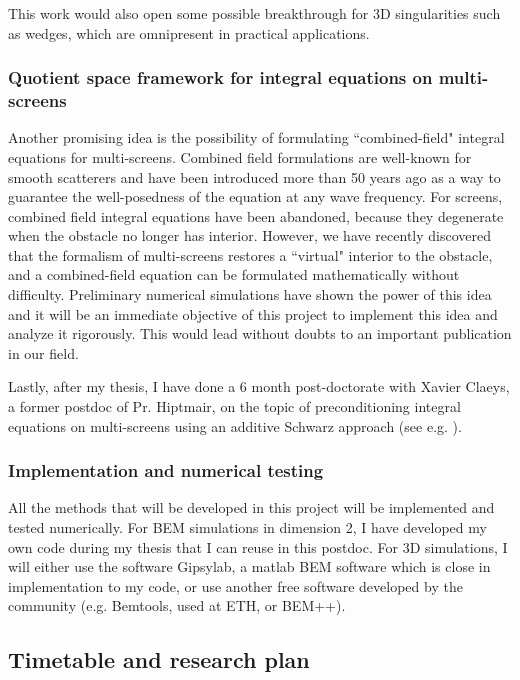 \documentclass[]{article}
\begin{document}
This work would also open some possible breakthrough for 3D singularities such as wedges, which are omnipresent in practical applications. 

\subsubsection*{Quotient space framework for integral equations on multi-screens}

Another promising idea is the possibility of formulating ``combined-field" integral equations for multi-screens. Combined field formulations are well-known for smooth scatterers and have been introduced more than 50 years ago \cite{brakhage1965dirichletsehe} as a way to guarantee the well-posedness of the equation at any wave frequency. For screens, combined field integral equations have been abandoned, because they degenerate when the obstacle no longer has interior. 
However, we have recently discovered that the formalism of multi-screens restores a ``virtual" interior to the obstacle, and a combined-field equation can be formulated mathematically without difficulty. Preliminary numerical simulations have shown the power of this idea and it will be an immediate objective of this project to implement this idea and analyze it rigorously. This would lead without doubts to an important publication in our field. 

Lastly, after my thesis, I have done a 6 month post-doctorate with Xavier Claeys, a former postdoc of Pr. Hiptmair, on the topic of preconditioning integral equations on multi-screens using an additive Schwarz approach (see e.g. \cite{marchand2019two}).

\subsubsection*{Implementation and numerical testing}

All the methods that will be developed in this project will be implemented and tested numerically. For BEM simulations in dimension 2, I have developed my own code during my thesis that I can reuse in this postdoc. For 3D simulations, I will either use the software Gipsylab, a matlab BEM software which is close in implementation to my code, or use another free software developed by the community (e.g. Bemtools, used at ETH, or BEM++).



\subsection*{Timetable and research plan}
\end{document}
